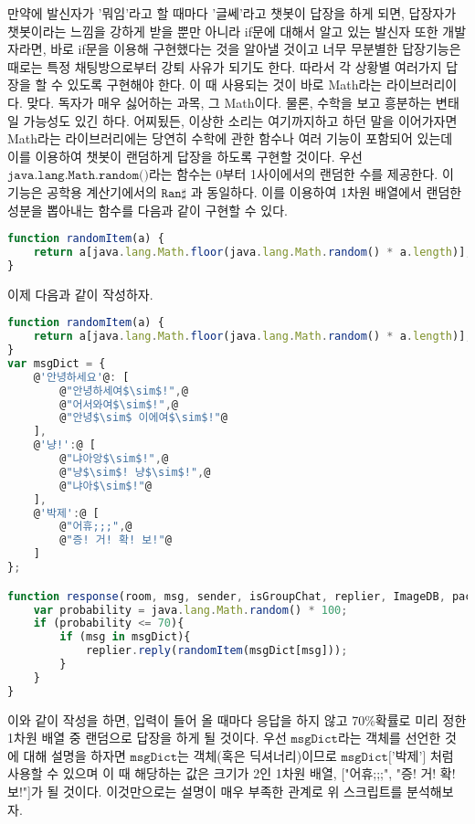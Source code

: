 \documentclass[10pt,a4paper,final]{book}
\begin{document}
만약에 발신자가 '뭐임'라고 할 때마다 '글쎄'라고 챗봇이 답장을 하게 되면, 답장자가 챗봇이라는
느낌을 강하게 받을 뿐만 아니라 if문에 대해서 알고 있는 발신자 또한 개발자라면, 바로 if문을
이용해 구현했다는 것을 알아낼 것이고 너무 무분별한 답장기능은 때로는 특정 채팅방으로부터 강퇴
사유가 되기도 한다. 따라서 각 상황별 여러가지 답장을 할 수 있도록 구현해야 한다. 이 때 사용되는
것이 바로 Math라는 라이브러리이다. 맞다. 독자가 매우 싫어하는 과목, 그 Math이다. 물론, 수학을
보고 흥분하는 변태일 가능성도 있긴 하다. 어찌됬든, 이상한 소리는 여기까지하고 하던 말을 이어가자면
Math라는 라이브러리에는 당연히 수학에 관한 함수나 여러 기능이 포함되어 있는데 이를 이용하여
챗봇이 랜덤하게 답장을 하도록 구현할 것이다.
우선 $\texttt{java.lang.Math.random()}$라는 함수는 0부터 1사이에서의 랜덤한 수를 제공한다.
이 기능은 공학용 계산기에서의 $\texttt{Ran}\sharp$ 과 동일하다.
이를 이용하여 1차원 배열에서 랜덤한 성분을 뽑아내는 함수를 다음과 같이 구현할 수 있다.
\begin{lstlisting}[language=JavaScript,escapeinside=~~, caption={$\texttt{randomItem(array)}$}]
function randomItem(a) {
    return a[java.lang.Math.floor(java.lang.Math.random() * a.length)];
}
\end{lstlisting}
이제 다음과 같이 작성하자.
\begin{lstlisting}[language=JavaScript,escapeinside=@@, caption={RandomReply.js}]
function randomItem(a) {
    return a[java.lang.Math.floor(java.lang.Math.random() * a.length)];
}
var msgDict = {
    @'안녕하세요'@: [
        @"안녕하세여$\sim$!",@
        @"어서와여$\sim$!",@
        @"안녕$\sim$ 이에여$\sim$!"@
    ],
    @'냥!':@ [
        @"냐아앙$\sim$!",@
        @"냥$\sim$! 냥$\sim$!",@
        @"냐아$\sim$!"@
    ],
    @'박제':@ [
        @"어휴;;;",@
        @"증! 거! 확! 보!"@
    ]
};

function response(room, msg, sender, isGroupChat, replier, ImageDB, packageName, threadId){
    var probability = java.lang.Math.random() * 100;
    if (probability <= 70){
        if (msg in msgDict){
            replier.reply(randomItem(msgDict[msg]));
        }
    }
}
\end{lstlisting}
이와 같이 작성을 하면, 입력이 들어 올 때마다 응답을 하지 않고 70\%확률로 미리 정한 1차원 배열 중 랜덤으로
답장을 하게 될 것이다. 우선 $\texttt{msgDict}$라는 객체를 선언한 것에 대해 설명을 하자면
$\texttt{msgDict}$는 객체(혹은 딕셔너리)이므로 $\texttt{msgDict['박제']}$ 처럼 사용할 수 있으며 이 때 해당하는 값은 크기가 2인 1차원 배열,
["어휴;;;", "증! 거! 확! 보!"]가 될 것이다. 이것만으로는 설명이 매우 부족한 관계로 위 스크립트를 분석해보자.
\end{document}

